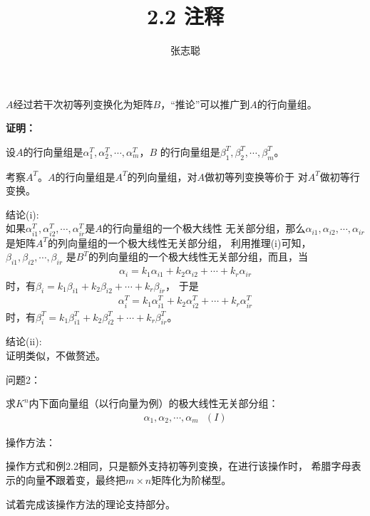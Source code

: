 \documentclass{article}
\begin{document}
\title{2.2 注释}
\author{张志聪}
\maketitle

\begin{zremark}
  $A$经过若干次初等列变换化为矩阵$B$，“推论”可以推广到$A$的行向量组。
\end{zremark}

\textbf{证明：}

设$A$的行向量组是$\alpha_1^T, \alpha_2^T, \cdots, \alpha_m^T$，$B$
的行向量组是$\beta_1^T, \beta_2^T, \cdots, \beta_m^T$。

考察$A^T$。$A$的行向量组是$A^T$的列向量组，对$A$做初等列变换等价于
对$A^T$做初等行变换。

结论(i):\\
如果$\alpha_{i1}^T, \alpha_{i2}^T, \cdots, \alpha_{ir}^T$是$A$的行向量组的一个极大线性
无关部分组，那么$\alpha_{i1}, \alpha_{i2}, \cdots, \alpha_{ir}$
是矩阵$A^T$的列向量组的一个极大线性无关部分组，
利用推理(i)可知，$\beta_{i1}, \beta_{i2}, \cdots, \beta_{ir}$
是$B^T$的列向量组的一个极大线性无关部分组，而且，当
\begin{align*}
  \alpha_i = k_1 \alpha_{i1} + k_2 \alpha_{i2} + \cdots + k_r \alpha_{ir}
\end{align*}
时，有$\beta_i = k_1 \beta_{i1} + k_2 \beta_{i2} + \cdots + k_r \beta_{ir}$，
于是
\begin{align*}
  \alpha_i^T = k_1 \alpha_{i1}^T + k_2 \alpha_{i2}^T + \cdots + k_r \alpha_{ir}^T
\end{align*}
时，有$\beta_i^T = k_1 \beta_{i1}^T + k_2 \beta_{i2}^T + \cdots + k_r \beta_{ir}^T$。

结论(ii): \\
证明类似，不做赘述。

\begin{zremark}
  问题2：

  求$K^n$内下面向量组（以行向量为例）的极大线性无关部分组：
  \begin{align*}
    \alpha_1, \alpha_2, \cdots, \alpha_m \ \ \ (I)
  \end{align*}

  操作方法：

  操作方式和例2.2相同，只是额外支持初等列变换，在进行该操作时，
  希腊字母表示的向量\textbf{不}跟着变，最终把$m \times n$矩阵化为阶梯型。

  试着完成该操作方法的理论支持部分。
\end{zremark}
\end{document}
